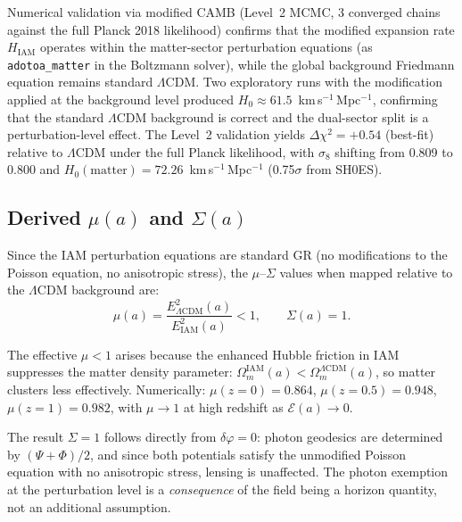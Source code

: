 \documentclass[11pt]{article}
\begin{document}
Numerical validation via modified CAMB (Level~2 MCMC, 3 converged chains
against the full Planck 2018 likelihood) confirms that the modified expansion
rate $H_\mathrm{IAM}$ operates within the matter-sector perturbation equations
(as \texttt{adotoa\_matter} in the Boltzmann solver), while the global
background Friedmann equation remains standard $\Lambda$CDM.  Two exploratory
runs with the modification applied at the background level produced
$H_0 \approx 61.5$~km\,s$^{-1}$\,Mpc$^{-1}$, confirming that the standard
$\Lambda$CDM background is correct and the dual-sector split is a
perturbation-level effect.  The Level~2 validation yields
$\Delta\chi^2 = +0.54$ (best-fit) relative to $\Lambda$CDM under the full
Planck likelihood, with $\sigma_8$ shifting from 0.809 to 0.800 and
$H_0(\mathrm{matter}) = 72.26$~km\,s$^{-1}$\,Mpc$^{-1}$
(0.75$\sigma$ from SH0ES).

\subsection{Derived $\mu(a)$ and $\Sigma(a)$}

Since the IAM perturbation equations are standard GR (no modifications to
the Poisson equation, no anisotropic stress), the $\mu$--$\Sigma$ values
when mapped relative to the $\Lambda$CDM background are:
\begin{equation}
\boxed{\mu(a) = \frac{E^2_{\Lambda\mathrm{CDM}}(a)}{E^2_\mathrm{IAM}(a)} < 1,
\qquad \Sigma(a) = 1.}
\label{eq:mu_sigma_derived}
\end{equation}

The effective $\mu < 1$ arises because the enhanced Hubble friction in IAM
suppresses the matter density parameter:
$\Omega_m^\mathrm{IAM}(a) < \Omega_m^{\Lambda\mathrm{CDM}}(a)$, so matter
clusters less effectively.  Numerically: $\mu(z{=}0) = 0.864$,
$\mu(z{=}0.5) = 0.948$, $\mu(z{=}1) = 0.982$, with $\mu \to 1$ at high
redshift as $\mathcal{E}(a) \to 0$.

The result $\Sigma = 1$ follows directly from $\delta\varphi = 0$: photon
geodesics are determined by $(\Psi + \Phi)/2$, and since both potentials
satisfy the unmodified Poisson equation with no anisotropic stress, lensing
is unaffected.  The photon exemption at the perturbation level is a
\textit{consequence} of the field being a horizon quantity, not an additional
assumption.
\end{document}
